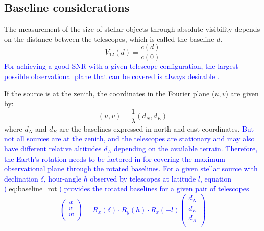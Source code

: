 \subsection{Baseline considerations}
The measurement of the size of stellar objects through absolute visibility depends on the distance between the telescopes, which is called the baseline $d$. 
\begin{equation}
	V_{12}(d) = \frac{c(d)}{c(0)}
	\label{eq:angular_size_meas}
\end{equation}
\textcolor{blue}{For achieving a good SNR with a given telescope configuration, the largest possible observational plane that can be covered is always desirable \citep{acciari2020optical, abeysekara2020demonstration}.}

If the source is at the zenith, the coordinates in the Fourier plane ($u,v$) are given by:
\begin{equation}
	(u,v) = \frac{1}{\lambda} (d_N, d_E)
\end{equation}
where $d_N$ and $d_E$ are the baselines expressed in north and east coordinates. 
\textcolor{blue}{But not all sources are at the zenith, and the telescopes are stationary and may also have different relative altitudes $d_A$ depending on the available terrain. Therefore, the Earth's rotation needs to be factored in for covering the maximum observational plane through the rotated baselines. 
For a given stellar source with declination $\delta$, hour-angle $h$ observed by telescopes at latitude $l$, equation (\ref{eq:baseline_rot}) provides the rotated
baselines for a given pair of telescopes \citep{dravins2013optical, saha2020theory}
\begin{equation}
\begin{pmatrix} u\\ v\\ w\\ \end{pmatrix} = R_x(\delta) \cdot R_y(h) \cdot R_x(-l) \begin{pmatrix} d_N\\ d_E\\ d_A\\ \end{pmatrix}
	\label{eq:baseline_rot}
\end{equation}
}
